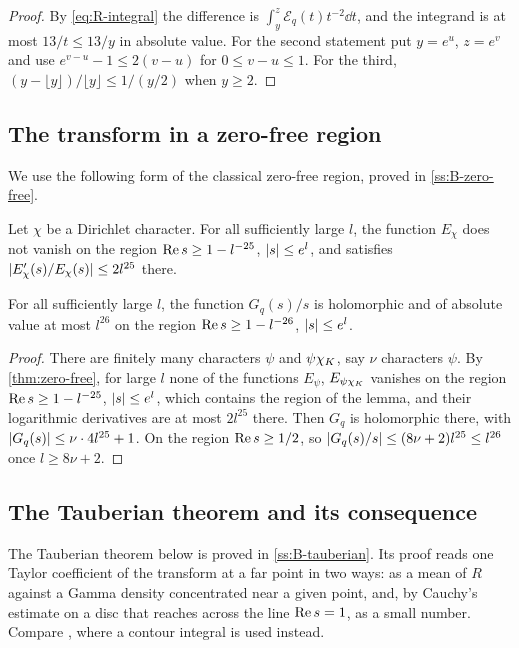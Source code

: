 \begin{proof}
By \eqref{eq:R-integral} the difference is $\int_y^z\mathcal E_q(t)t^{-2}\dd t$, and the integrand is
at most $13/t\le13/y$ in absolute value. For the second statement put $y=e^u$, $z=e^v$ and use
$e^{v-u}-1\le2(v-u)$ for $0\le v-u\le1$. For the third, $(y-\lfloor y\rfloor)/\lfloor y\rfloor
\le1/(y/2)$ when $y\ge2$.
\end{proof}

\subsection{The transform in a zero-free region}\label{ss:transform-zero-free}
We use the following form of the classical zero-free region, proved in \cref{ss:B-zero-free}.

\begin{theorem}\label{thm:zero-free}
Let $\chi$ be a Dirichlet character. For all sufficiently large $l$, the function $E_\chi$ does not
vanish on the region $\operatorname{Re} s\ge1-l^{-25}$, $\lvert s\rvert\le e^l$, and satisfies
$\lvert E_\chi'(s)/E_\chi(s)\rvert\le2l^{25}$ there.
\end{theorem}

\begin{lemma}\label{lem:G-bound}
For all sufficiently large $l$, the function $G_q(s)/s$ is holomorphic and of absolute value at most
$l^{26}$ on the region $\operatorname{Re} s\ge1-l^{-26}$, $\lvert s\rvert\le e^l$.
\end{lemma}

\begin{proof}
There are finitely many characters $\psi$ and $\psi\chi_K$, say $\nu$ characters $\psi$. By
\cref{thm:zero-free}, for large $l$ none of the functions $E_\psi$, $E_{\psi\chi_K}$ vanishes on the
region $\operatorname{Re} s\ge1-l^{-25}$, $\lvert s\rvert\le e^l$, which contains the region of the lemma, and their
logarithmic derivatives are at most $2l^{25}$ there. Then $G_q$ is holomorphic there, with
$\lvert G_q(s)\rvert\le\nu\cdot4l^{25}+1$. On the region $\operatorname{Re} s\ge1/2$, so $\lvert G_q(s)/s\rvert\le
(8\nu+2)l^{25}\le l^{26}$ once $l\ge8\nu+2$.
\end{proof}

\subsection{The Tauberian theorem and its consequence}\label{ss:tauberian-application}
The Tauberian theorem below is proved in \cref{ss:B-tauberian}. Its proof reads one Taylor
coefficient of the transform at a far point in two ways: as a mean of $R$ against a Gamma density
concentrated near a given point, and, by Cauchy's estimate on a disc that reaches across the line
$\operatorname{Re} s=1$, as a small number. Compare \cite[\S6.2]{MontgomeryVaughan2007}, where a contour integral
is used instead.


